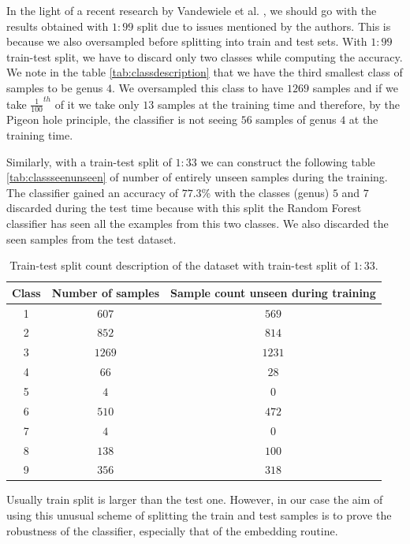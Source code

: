 \documentclass[oneside, twocolumn, a4paper, 10pt]{IEEEtran}
\begin{document}
\par
In the light of a recent research by Vandewiele et al. \cite{23}, we should go with the results obtained with $1:99$ split due to issues mentioned by the authors. This is because we also oversampled before splitting into train and test sets. With $1:99$ train-test split, we have to discard only two classes while computing the accuracy. We note in the table \autoref{tab:classdescription} that we have the third smallest class of samples to be genus $4$. We oversampled this class to have $1269$ samples and if we take $\frac{1}{100}^{th}$ of it we take only $13$ samples at the training time and therefore, by the Pigeon hole principle, the classifier is not seeing $56$ samples of genus $4$ at the training time.\\
\par 
Similarly, with a train-test split of $1:33$ we can construct the following table \autoref{tab:classseenunseen} of number of entirely unseen samples during the training. The classifier gained an accuracy of $77.3$\% with the classes (genus) $5$ and $7$ discarded during the test time because with this split the Random Forest classifier has seen all the examples from this two classes. We also discarded the seen samples from the test dataset.
\begin{table}
\begin{center}
\begin{tabular}{|c|c|c|}
\hline
Class & Number of samples & Sample count unseen during training\\ \hline
1 & $607$ & $569$\\ \hline
2 & $852$ & $814$\\ \hline
3 & $1269$ & $1231$\\ \hline
4 & $66$ & $28$\\ \hline
5 & $4$ & $0$\\ \hline
6 & $510$ & $472$\\ \hline
7 & $4$ & $0$\\ \hline
8 & $138$ & $100$\\ \hline
9 & $356$ & $318$\\ \hline
\end{tabular}
\caption{Train-test split count description of the dataset with train-test split of $1:33$.}
\label{tab:classseenunseen}
\end{center}
\end{table}
Usually train split is larger than the test one. However, in our case the aim of using this unusual scheme of splitting the train and test samples is to prove the robustness of the classifier, especially that of the embedding routine.
\end{document}
